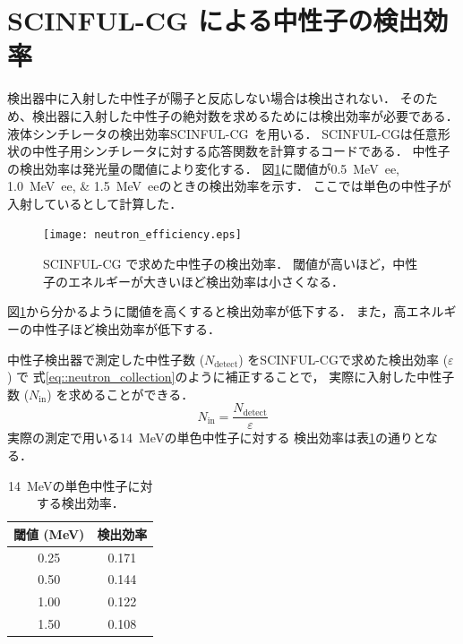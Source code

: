 \documentclass[../master]{subfiles}
\begin{document}
\section{SCINFUL-CG による中性子の検出効率}
検出器中に入射した中性子が陽子と反応しない場合は検出されない．
そのため、検出器に入射した中性子の絶対数を求めるためには検出効率が必要である．
液体シンチレータの検出効率SCINFUL-CG~\cite{scinful-cg}を用いる．
SCINFUL-CGは任意形状の中性子用シンチレータに対する応答関数を計算するコードである．
中性子の検出効率は発光量の閾値により変化する．
図\ref{fig::neutron_efficiency}に閾値が\SIlist{0.5;1.0;1.5}{\mega\electronvolt ee}のときの検出効率を示す．
ここでは単色の中性子が入射しているとして計算した．
\begin{figure}
  \centering
  \texttt{[image: neutron\_efficiency.eps]}
  \caption[SCINFUL-CG で求めた中性子の検出効率．]
          {SCINFUL-CG で求めた中性子の検出効率．
          閾値が高いほど，中性子のエネルギーが大きいほど検出効率は小さくなる．}
  \label{fig::neutron_efficiency}
\end{figure}
図\ref{fig::neutron_efficiency}から分かるように閾値を高くすると検出効率が低下する．
また，高エネルギーの中性子ほど検出効率が低下する．

中性子検出器で測定した中性子数 ($N_{\text{detect}}$) をSCINFUL-CGで求めた検出効率 ($\varepsilon$) で
式\ref{eq::neutron_collection}のように補正することで，
実際に入射した中性子数 ($N_{\text{in}}$) を求めることができる．
\begin{equation}
  N_{\text{in}} = \frac{N_{\text{detect}}}{\varepsilon}
  \label{eq::neutron_collection}
\end{equation}
実際の測定で用いる\SI{14}{\mega\electronvolt}の単色中性子に対する
検出効率は表\ref{tab::neutron_efficiency}の通りとなる．
\begin{table}
  \centering
  \caption{\SI{14}{\mega\electronvolt}の単色中性子に対する検出効率．}
  \label{tab::neutron_efficiency}
  \begin{tabular}{cc}
    \toprule
    閾値 (\si{\mega\electronvolt}) & 検出効率 \\
    \midrule
    0.25 & 0.171 \\
    0.50 & 0.144 \\
    1.00 & 0.122 \\
    1.50 & 0.108 \\
    \bottomrule
  \end{tabular}
\end{table}
\end{document}
